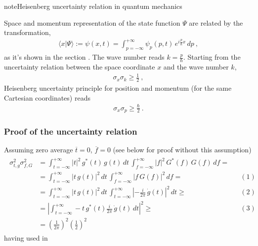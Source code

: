 \documentclass[letterpaper,10pt,english]{jupyterBook}
\begin{document}
\begin{sphinxadmonition}{note}{Heisenberg uncertainty relation in quantum mechanics}

\sphinxAtStartPar
Space and momentum representation of the state function \(\Psi\) are related by the transformation,
\begin{equation*}
\begin{split}\langle x | \Psi \rangle := \psi(x,t) = \int_{p=-\infty}^{+\infty} \psi_p(p,t) \, e^{i \frac{p}{\hbar} x} \, dp \ ,\end{split}
\end{equation*}
\sphinxAtStartPar
as it’s shown in the section .
The wave number reads \(k = \frac{p}{\hbar}\). Starting from the uncertainty relation between the space coordinate \(x\) and the wave number \(k\),
\begin{equation*}
\begin{split}\sigma_{x} \sigma_{k} \ge  \frac{1}{2}  \ , \end{split}
\end{equation*}
\sphinxAtStartPar
Heisenberg uncertainty principle for position and momentum (for the same Cartesian coordinates) reads
\begin{equation*}
\begin{split}\sigma_{x} \sigma_{p} \ge \frac{\hbar}{2} \ . \end{split}
\end{equation*}\end{sphinxadmonition}
\subsubsection*{Proof of the uncertainty relation}

\sphinxAtStartPar
Assuming zero average \(\overline{t} = 0\), \(\overline{f} = 0\) (see below for proof without this assumption)
\begin{equation*}
\begin{split}\begin{aligned}
 \sigma_{t,g}^2 \sigma_{f,G}^2
 & = \int_{t=-\infty}^{+\infty} \left| t \right|^2 \, g^*(t) \, g(t)  \, dt \,  \int_{f=-\infty}^{+\infty} \left| f \right|^2 \, G^*(f) \, G(f) \, df = \\
 & = \int_{t=-\infty}^{+\infty} \left| t  \, g(t) \right|^2 \, dt \,  \int_{f=-\infty}^{+\infty} \left| f  \,  G(f)\right|^2 \, df = && (1) \\
 & = \int_{t=-\infty}^{+\infty} \left| t  \, g(t) \right|^2 \, dt \, \int_{t=-\infty}^{+\infty} \left|  -\frac{i}{2 \pi} \, \dot{g}(t) \right|^2 \, dt \ge && (2) \\
 & = \left| \int_{t=-\infty}^{+\infty} - t  \, g^*(t)  \frac{i}{2 \pi} \, \dot{g}(t) \, dt \right|^2 \ge && (3)  \\
 & = \left( \frac{1}{2\pi} \right)^2 \left( \frac{1}{2} \right)^2
\end{aligned}\end{split}
\end{equation*}
\sphinxAtStartPar
having used in
\end{document}

